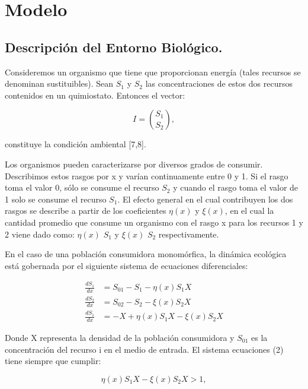\section{Modelo}
\subsection{Descripción del Entorno Biológico.}

Consideremos un organismo que tiene que proporcionan energía (tales recursos se denominan sustituibles). Sean $S_1$ y $S_2$ las concentraciones de estos dos recursos contenidos en un quimiostato. Entonces el vector:

\begin{equation}
	I=\binom{S_{1}}{S_{2}},
\end{equation}

constituye la condición ambiental [7,8].

Los organismos pueden caracterizarse por diversos grados de consumir. Describimos estos rasgos por x y varían continuamente entre 0 y 1. Si el rasgo toma el valor 0, sólo se consume el recurso $S_2$ y cuando el rasgo toma el valor de 1 solo se consume el recurso $S_1$. El efecto general en el cual contribuyen los dos rasgos se describe a partir de los coeficientes $\eta(x)$  y $\xi(x)$, en el cual la cantidad promedio que consume un organismo con el rasgo x para los recursos 1 y 2 viene dado como:  $\eta(x)$ $S_1$ y $\xi(x)$ $S_2$ respectivamente.

En el caso de una población consumidora monomórfica, la dinámica ecológica está gobernada por el siguiente sistema de ecuaciones diferenciales:

\begin{equation}
	\begin{split}
		\frac{d S_1}{dx} & =S_{01}-S_1-\eta(x)S_1X \\  \frac{d S_2}{dx}&=S_{02}-S_2-\xi(x)S_2X\\ \frac{d S_1}{dx}&=-X+\eta(x)S_1X-\xi(x)S_2X
	\end{split}
\end{equation}

Donde X representa la densidad de la población consumidora y $S_{01}$ es la concentración del recurso i en el medio de entrada.
El sistema ecuaciones (2) tiene siempre que cumplir:

\begin{equation}
	\eta(x)S_1X-\xi(x)S_2X>1,
\end{equation}

